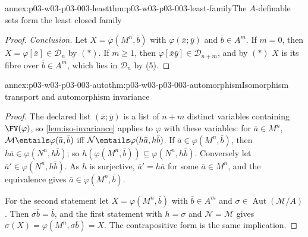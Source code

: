 \begin{annexitem}{annex:p03-w03-p03-003-least}{thm:p03-w03-p03-003-least-family}{The \(A\)-definable sets form the least closed family}
\begin{proof}
\emph{Conclusion.}  Let \(X=\varphi(M^n,\bar b)\) with
\(\varphi(\bar x;\bar y)\) and \(\bar b\in A^m\).  If \(m=0\), then
\(X=\varphi[\bar x]\in\mathcal D_n\) by \((\ast)\).  If \(m\geq1\), then
\(\varphi[\bar x\bar y]\in\mathcal D_{n+m}\), and by \((\ast)\) \(X\) is its
fibre over \(\bar b\in A^m\), which lies in \(\mathcal D_n\) by (5).
\end{proof}
\end{annexitem}

\begin{annexitem}{annex:p03-w03-p03-003-auto}{thm:p03-w03-p03-003-automorphism}{Isomorphism transport and automorphism invariance}
\begin{proof}
The declared list \((\bar x;\bar y)\) is a list of \(n+m\) distinct
variables containing \(\FV(\varphi)\), so \cref{lem:iso-invariance} applies
to \(\varphi\) with these variables: for \(\bar a\in M^n\),
\(\mathcal M\entails\varphi(\bar a,\bar b)\) iff
\(\mathcal N\entails\varphi(h\bar a,h\bar b)\).  If
\(\bar a\in\varphi(M^n,\bar b)\), then \(h\bar a\in\varphi(N^n,h\bar b)\);
so \(h(\varphi(M^n,\bar b))\subseteq\varphi(N^n,h\bar b)\).  Conversely let
\(\bar a'\in\varphi(N^n,h\bar b)\).  As \(h\) is surjective,
\(\bar a'=h\bar a\) for some \(\bar a\in M^n\), and the equivalence gives
\(\bar a\in\varphi(M^n,\bar b)\).

For the second statement let \(X=\varphi(M^n,\bar b)\) with
\(\bar b\in A^m\) and \(\sigma\in\operatorname{Aut}(\mathcal M/A)\).  Then
\(\sigma\bar b=\bar b\), and the first statement with \(h=\sigma\) and
\(\mathcal N=\mathcal M\) gives \(\sigma(X)=\varphi(M^n,\sigma\bar b)=X\).
The contrapositive form is the same implication.
\end{proof}
\end{annexitem}

